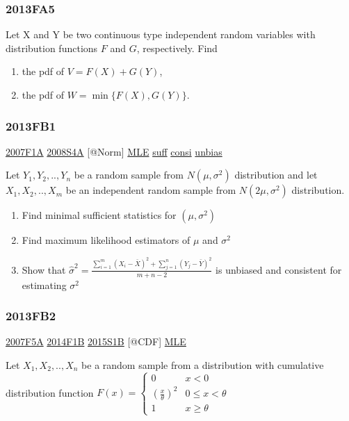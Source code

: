 \documentclass[10pt,twocolumn,portrait]{article}
\begin{document}
\hypertarget{fa5}{%
\subsubsection{2013FA5}\label{fa5}}

Let X and Y be two continuous type independent random variables with
distribution functions \(F\) and \(G\), respectively. Find

\begin{enumerate}
\def\labelenumi{(\alph{enumi})}
\item
  the pdf of \(V=F(X)+G(Y)\),
\item
  the pdf of \(W=\min\{F(X),G(Y)\}\).
\end{enumerate}

\hypertarget{fb1-2}{%
\subsubsection{2013FB1}\label{fb1-2}}

\protect\hyperlink{f1a}{2007F1A} \protect\hyperlink{s4a}{2008S4A}
{[}@Norm{]} \protect\hyperlink{MLE}{MLE}
\protect\hyperlink{section-6}{suff} \protect\hyperlink{section-8}{consi}
\protect\hyperlink{section-4}{unbias}

Let \(Y_1,Y_2,..,Y_{n}\) be a random sample from \(N(\mu,\sigma^2)\)
distribution and let \(X_1,X_2,..,X_{m}\) be an independent random
sample from \(N(2\mu,\sigma^2)\) distribution.

\begin{enumerate}
\def\labelenumi{(\alph{enumi})}
\item
  Find minimal sufficient statistics for \((\mu,\sigma^2)\)
\item
  Find maximum likelihood estimators of \(\mu\) and \(\sigma^2\)
\item
  Show that
  \(\hat\sigma^2=\frac{\sum_{i=1}^m(X_i-\bar X)^2+\sum_{j=1}^n(Y_j-\bar Y)^2}{m+n-2}\)
  is unbiased and consistent for estimating \(\sigma^2\)
\end{enumerate}

\hypertarget{fb2-2}{%
\subsubsection{2013FB2}\label{fb2-2}}

\protect\hyperlink{f5a}{2007F5A} \protect\hyperlink{f1b-1}{2014F1B}
\protect\hyperlink{s1b-1}{2015S1B} {[}@CDF{]}
\protect\hyperlink{MLE}{MLE}

Let \(X_1,X_2,..,X_n\) be a random sample from a distribution with
cumulative distribution function
\(F(x)=\begin{cases}0&x<0\\(\frac{x}\theta)^2& 0\le x<\theta\\1& x\ge\theta\end{cases}\)
\end{document}
